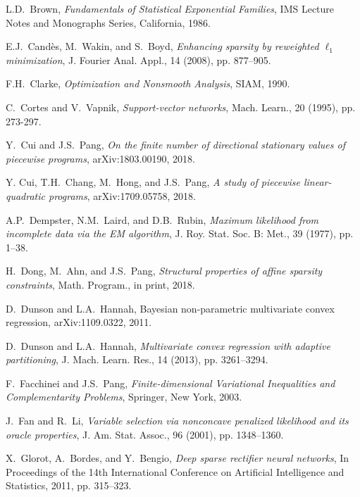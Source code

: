 \documentclass{siamart}
\begin{document}
\begin{thebibliography}{999}
{
{\sc L.D.\ Brown},
{\sl Fundamentals of Statistical Exponential Families},
IMS Lecture Notes and Monographs Series, California, 1986.


{\sc E.J.\ Cand{\`e}s, M.\ Wakin, and S.\ Boyd},
{\sl Enhancing sparsity by reweighted $\ell_1$ minimization},
J. Fourier Anal. Appl., 14 (2008), pp. 877--905.


{\sc F.H.\ Clarke},
{\sl Optimization and Nonsmooth Analysis},
SIAM, 1990.

{\sc C.\ Cortes and V.\ Vapnik},
{\sl Support-vector networks},
Mach. Learn., 20 (1995), pp. 273-297.


{\sc Y.\ Cui and J.S.\ Pang},
{\sl On the finite number of directional stationary values of piecewise programs},
arXiv:1803.00190, 2018.

{\sc Y. Cui, T.H.\ Chang, M.\ Hong, and J.S.\ Pang},
{\sl A study of piecewise linear-quadratic programs},
arXiv:1709.05758, 2018.
	
{\sc A.P.\ Dempster, N.M.\ Laird,  and D.B.\ Rubin},
{\sl Maximum likelihood from incomplete data via the EM algorithm},
 J. Roy. Stat. Soc. B: Met., 39 (1977), pp. 1--38.



{\sc H.\ Dong, M.\ Ahn, and J.S.\ Pang},
{\sl Structural properties of affine sparsity constraints},
Math. Program., in print, 2018.

{\sc D.\ Dunson and L.A.\ Hannah},
Bayesian non-parametric multivariate convex regression,
arXiv:1109.0322, 2011.

{\sc D.\ Dunson and L.A.\ Hannah},
{\sl Multivariate convex regression with adaptive partitioning},
J. Mach. Learn. Res., 14 (2013), pp. 3261--3294.


{\sc F.\ Facchinei and J.S.\ Pang},
{\sl Finite-dimensional Variational Inequalities and Complementarity Problems},
Springer, New York, 2003.

{\sc J.\ Fan and R.\ Li},
{\sl Variable selection via nonconcave penalized likelihood and its oracle properties},
J. Am. Stat. Assoc., 96 (2001), pp. 1348--1360.

{\sc X.\ Glorot, A.\ Bordes, and Y.\ Bengio},
{\sl  Deep sparse rectifier neural networks},
In  Proceedings of the 14th International Conference on Artificial Intelligence and Statistics,  2011, pp. 315--323.


}
\end{thebibliography}
\end{document}
